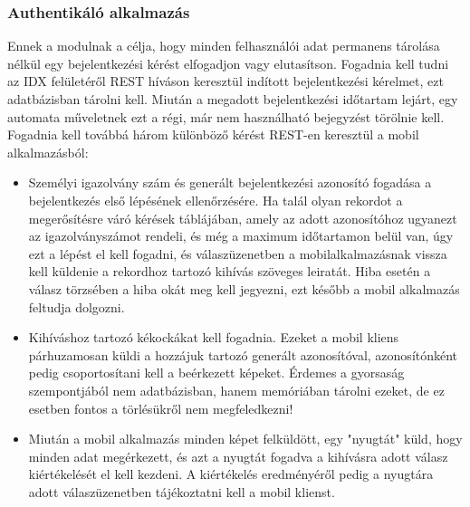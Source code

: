 \subsubsection{Authentikáló alkalmazás}
Ennek a modulnak a célja, hogy minden felhasználói adat permanens tárolása nélkül egy bejelentkezési kérést elfogadjon vagy elutasítson. Fogadnia kell tudni az IDX felületéről REST híváson keresztül indított bejelentkezési kérelmet, ezt adatbázisban tárolni kell. Miután a megadott bejelentkezési időtartam lejárt, egy automata műveletnek ezt a régi, már nem használható bejegyzést törölnie kell.\\
Fogadnia kell továbbá három különböző kérést REST-en keresztül a mobil alkalmazásból:
\begin{itemize}
\item Személyi igazolvány szám és generált bejelentkezési azonosító fogadása a bejelentkezés első lépésének ellenőrzésére. Ha talál olyan rekordot a megerősítésre váró kérések táblájában, amely az adott azonosítóhoz ugyanezt az igazolványszámot rendeli, és még a maximum időtartamon belül van, úgy ezt a lépést el kell fogadni, és válaszüzenetben a mobilalkalmazásnak vissza kell küldenie a rekordhoz tartozó kihívás szöveges leiratát. Hiba esetén a válasz törzsében a hiba okát meg kell jegyezni, ezt később a mobil alkalmazás feltudja dolgozni.
\item Kihíváshoz tartozó kékockákat kell fogadnia. Ezeket a mobil kliens párhuzamosan küldi a hozzájuk tartozó generált azonosítóval, azonosítónként pedig csoportosítani kell a beérkezett képeket. Érdemes a gyorsaság szempontjából nem adatbázisban, hanem memóriában tárolni ezeket, de ez esetben fontos a törlésükről nem megfeledkezni!
\item Miután a mobil alkalmazás minden képet felküldött, egy "nyugtát" küld, hogy minden adat megérkezett, és azt a nyugtát fogadva a kihívásra adott válasz kiértékelését el kell kezdeni. A kiértékelés eredményéről pedig a nyugtára adott válaszüzenetben tájékoztatni kell a mobil klienst.
\end{itemize}

